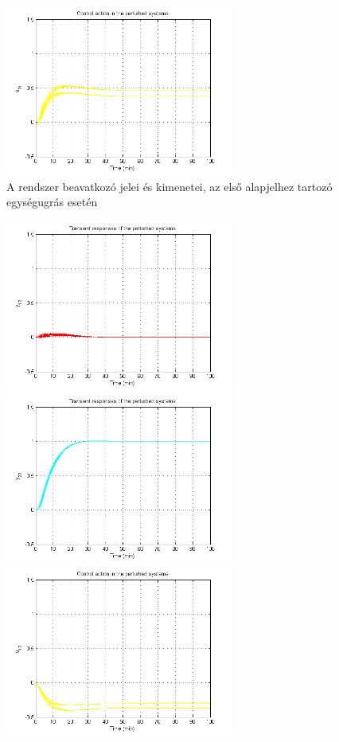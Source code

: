\begin{figure}[!ht]
	\includegraphics[width=75mm,keepaspectratio]{figures/2m06/prt_old_4.png}
		\caption{A rendszer beavatkozó jelei és kimenetei, az első alapjelhez tartozó egységugrás esetén}
	\label{fig:PrtOld1}
\end{figure}
\begin{figure}[!ht]
	\includegraphics[width=75mm,keepaspectratio]{figures/2m06/prt_old_5.png}
	\includegraphics[width=75mm,keepaspectratio]{figures/2m06/prt_old_6.png}\vspace{2mm}
	\includegraphics[width=75mm,keepaspectratio]{figures/2m06/prt_old_7.png}

\end{figure}
